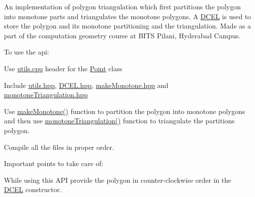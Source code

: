 \label{index_md_src_Readme}%
%
 An implementation of polygon triangulation which first partitions the polygon into monotone parts and triangulates the monotone polygons. A \mbox{\hyperlink{class_d_c_e_l}{D\+C\+EL}} is used to store the polygon and its monotone partitioning and the triangulation. Made as a part of the computation geometry course at B\+I\+TS Pilani, Hyderabad Campus.

To use the api\+:


\begin{DoxyItemize}
\item Use \mbox{\hyperlink{utils_8cpp}{utils.\+cpp}} header for the \mbox{\hyperlink{class_point}{Point}} class
\item Include \mbox{\hyperlink{utils_8hpp}{utils.\+hpp}}, \mbox{\hyperlink{_d_c_e_l_8hpp}{D\+C\+E\+L.\+hpp}}, \mbox{\hyperlink{make_monotone_8hpp}{make\+Monotone.\+hpp}} and \mbox{\hyperlink{monotone_triangulation_8hpp}{monotone\+Triangulation.\+hpp}}
\item Use \mbox{\hyperlink{make_monotone_8cpp_a31a4c0ba0613e4dee1f5892f6ea2c365}{make\+Monotone()}} function to partition the polygon into monotone polygons and then use \mbox{\hyperlink{monotone_triangulation_8cpp_a99e8ed0941479757edfb577ebe8d1061}{monotone\+Triangulation()}} function to triangulate the partitions polygon.
\item Compile all the files in proper order.
\end{DoxyItemize}

Important points to take care of\+:


\begin{DoxyItemize}
\item While using this A\+PI provide the polygon in counter-\/clockwise order in the \mbox{\hyperlink{class_d_c_e_l}{D\+C\+EL}} constructor. 
\end{DoxyItemize}